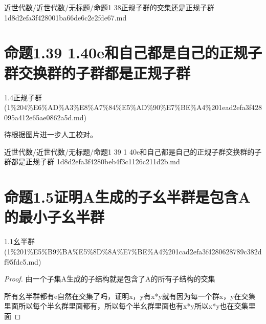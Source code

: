 \begin{note}[来源路径]

近世代数/近世代数/无标题/命题1 38正规子群的交集还是正规子群 1d8d2efa3f428001ba66de6c2e2fde67.md

\end{note}

\section*{命题1.39 1.40e和自己都是自己的正规子群交换群的子群都是正规子群}

\begin{note}[来源上级主题]

1.4正规子群 (1\%204\%E6\%AD\%A3\%E8\%A7\%84\%E5\%AD\%90\%E7\%BE\%A4\%201ead2efa3f428095a412e65ae0862a5d.md)

\end{note}

\begin{proposition}[命题1.39 1.40e和自己都是自己的正规子群交换群的子群都是正规子群]

待根据图片进一步人工校对。

\end{proposition}

\begin{note}[来源路径]

近世代数/近世代数/无标题/命题1 39 1 40e和自己都是自己的正规子群交换群的子群都是正规子群 1d8d2efa3f4280beb4f3c1126c211d2b.md

\end{note}

\section*{命题1.5证明A生成的子幺半群是包含A的最小子幺半群}

\begin{note}[来源上级主题]

1.1幺半群 (1\%201\%E5\%B9\%BA\%E5\%8D\%8A\%E7\%BE\%A4\%201cad2efa3f4280628789c382df95fdc5.md)

\end{note}

\begin{proof}

由一个子集A生成的子结构就是包含了A的所有子结构的交集

所有幺半群都有e自然在交集了吗，证明x，y有x*y就有因为每一个群x，y在交集里面所以每个半幺群里面都有，所以每个半幺群里面也有x*y所以x*y也在交集里面

\end{proof}

